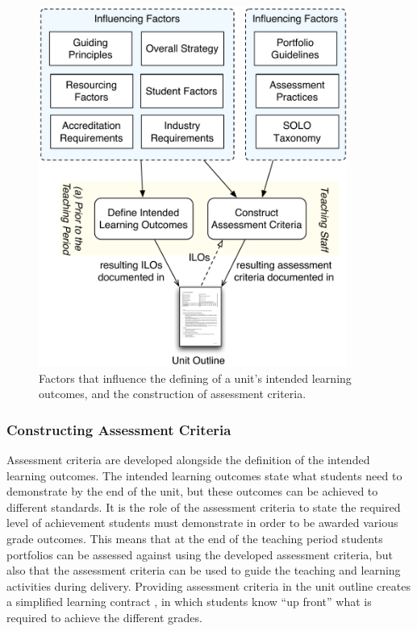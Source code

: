 \begin{figure}[p]
	\centering
	\includegraphics[width=0.9\textwidth]{DefiningILOs}
	\caption{Factors that influence the defining of a unit's intended learning outcomes, and the construction of assessment criteria.}
	\label{fig:defining_ilos}
\end{figure}


\clearpage
\subsubsection{Constructing Assessment Criteria} %
\label{sub:constructing_assessment_criteria}

Assessment criteria are developed alongside the definition of the intended learning outcomes. The intended learning outcomes state what students need to demonstrate by the end of the unit, but these outcomes can be achieved to different standards. It is the role of the assessment criteria to state the required level of achievement students must demonstrate in order to be awarded various grade outcomes. This means that at the end of the teaching period students portfolios can be assessed against using the developed assessment criteria, but also that the assessment criteria can be used to guide the teaching and learning activities during delivery. Providing assessment criteria in the unit outline creates a simplified learning contract \cite{Stephenson:1993}, in which students know ``up front'' what is required to achieve the different grades. 


